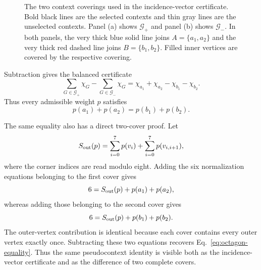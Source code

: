 \documentclass[
  twocolumn,
  aps,
  pra,
  floatfix,
  amsmath,amssymb,
  longbibliography
]{revtex4-2}
\theoremstyle{definition}
\theoremstyle{remark}
\begin{document}
\begin{figure}[t]
\caption{The two context coverings used in the incidence-vector certificate.
Bold black lines are the selected contexts and thin gray lines are the
unselected contexts.  Panel (a) shows $\mathcal G_+$ and panel (b) shows
$\mathcal G_-$.  In both panels, the very thick blue solid line joins
$A=\{a_1,a_2\}$ and the very thick red dashed line joins $B=\{b_1,b_2\}$.  Filled
inner vertices are covered by the respective covering.}
\label{fig:octagon}
\end{figure}

Subtraction gives the balanced certificate
\begin{equation}
 \sum_{G\in\mathcal G_+}\chi_G-
 \sum_{G\in\mathcal G_-}\chi_G
 =\chi_{a_1}+\chi_{a_2}-\chi_{b_1}-\chi_{b_2}.
 \label{eq:octagon-certificate}
\end{equation}
Thus every admissible weight $p$ %
satisfies
\begin{equation}
 p(a_1)+p(a_2)=p(b_1)+p(b_2).
 \label{eq:octagon-equality}
\end{equation}

The same equality also has a direct two-cover proof.  Let
\begin{equation*}
 S_{\rm out}(p)=\sum_{i=0}^{7}p(v_i)+
 \sum_{i=0}^{7}p(v_{i,i+1}),
\end{equation*}
where the corner indices are read modulo eight.  Adding the six
normalization equations belonging to the first cover gives
\begin{equation}
 6=S_{\rm out}(p)+p(a_1)+p(a_2),
 \label{eq:octagon-cover-plus}
\end{equation}
whereas adding those belonging to the second cover gives
\begin{equation}
 6=S_{\rm out}(p)+p(b_1)+p(b_2).
 \label{eq:octagon-cover-minus}
\end{equation}
The outer-vertex contribution is identical because each cover contains every
outer vertex exactly once.  Subtracting these two equations recovers
Eq.~\eqref{eq:octagon-equality}.  Thus the same pseudocontext identity is
visible both as the incidence-vector certificate and as the difference of two
complete covers.
\end{document}
